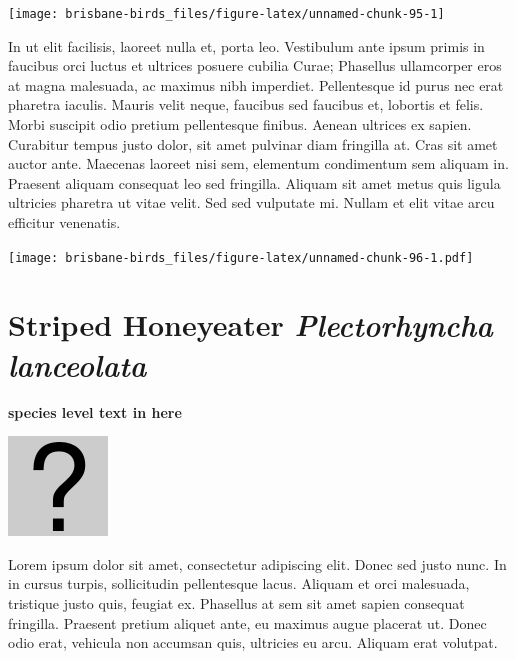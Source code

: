 \documentclass[]{book}
\let\origfigure\figure
\let\endorigfigure\endfigure
\renewenvironment{figure}[1][2] {
  \expandafter\origfigure\expandafter[H]
} {
  \endorigfigure
}
\begin{document}
\begin{figure}
\texttt{[image: brisbane-birds\_files/figure-latex/unnamed-chunk-95-1]} \caption{insert figure caption}\label{fig:unnamed-chunk-95}
\end{figure}

In ut elit facilisis, laoreet nulla et, porta leo. Vestibulum ante ipsum
primis in faucibus orci luctus et ultrices posuere cubilia Curae;
Phasellus ullamcorper eros at magna malesuada, ac maximus nibh
imperdiet. Pellentesque id purus nec erat pharetra iaculis. Mauris velit
neque, faucibus sed faucibus et, lobortis et felis. Morbi suscipit odio
pretium pellentesque finibus. Aenean ultrices ex sapien. Curabitur
tempus justo dolor, sit amet pulvinar diam fringilla at. Cras sit amet
auctor ante. Maecenas laoreet nisi sem, elementum condimentum sem
aliquam in. Praesent aliquam consequat leo sed fringilla. Aliquam sit
amet metus quis ligula ultricies pharetra ut vitae velit. Sed sed
vulputate mi. Nullam et elit vitae arcu efficitur venenatis.

\begin{figure}
\centering
\texttt{[image: brisbane-birds\_files/figure-latex/unnamed-chunk-96-1.pdf]}
\caption{\label{fig:unnamed-chunk-96}insert figure caption}
\end{figure}

\section{\texorpdfstring{Striped Honeyeater \emph{Plectorhyncha
lanceolata}}{Striped Honeyeater Plectorhyncha lanceolata}}\label{striped-honeyeater-plectorhyncha-lanceolata}

\textbf{species level text in here}

\begin{figure}
\centering
\includegraphics{assets/missing.png}
\caption{No image for species}
\end{figure}

Lorem ipsum dolor sit amet, consectetur adipiscing elit. Donec sed justo
nunc. In in cursus turpis, sollicitudin pellentesque lacus. Aliquam et
orci malesuada, tristique justo quis, feugiat ex. Phasellus at sem sit
amet sapien consequat fringilla. Praesent pretium aliquet ante, eu
maximus augue placerat ut. Donec odio erat, vehicula non accumsan quis,
ultricies eu arcu. Aliquam erat volutpat.
\end{document}
